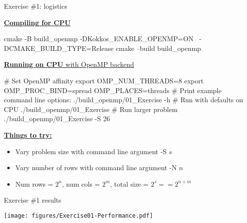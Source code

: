 \begin{frame}[fragile]{Exercise \#1: logistics}

\ul{\textbf{Compiling for CPU}}

\vspace{-3pt}
  \begin{small}
  \begin{code}
  cmake -B build_openmp -DKokkos_ENABLE_OPENMP=ON \
      -DCMAKE_BUILD_TYPE=Release
  cmake --build build_openmp
  \end{code}
  \end{small}


\ul{\textbf{Running on CPU} with OpenMP backend}

\vspace{-3pt}
  \begin{small}
  \begin{code}
  # Set OpenMP affinity
  export OMP_NUM_THREADS=8
  export OMP_PROC_BIND=spread OMP_PLACES=threads
  # Print example command line options:
  ./build_openmp/01_Exercise -h
  # Run with defaults on CPU
  ./build_openmp/01_Exercise
  # Run larger problem
  ./build_openmp/01_Exercise -S 26
  \end{code}
  \end{small}

\ul{\textbf{Things to try:}}
  \begin{small}
  \begin{itemize}
  \itemsep0em
  \item Vary problem size with command line argument -S $s$
  \item Vary number of rows with command line argument -N $n$
  \item Num rows = $2^n$, num cols = $2^m$, total size = $2^s == 2^{n+m}$
  \end{itemize}
  \end{small}
\end{frame}


\begin{frame}[fragile]{Exercise \#1 results}

  \vspace{-10pt}

  \begin{center}
    \texttt{[image: figures/Exercise01-Performance.pdf]}
  \end{center}

  \vspace{-15pt}

\end{frame}

